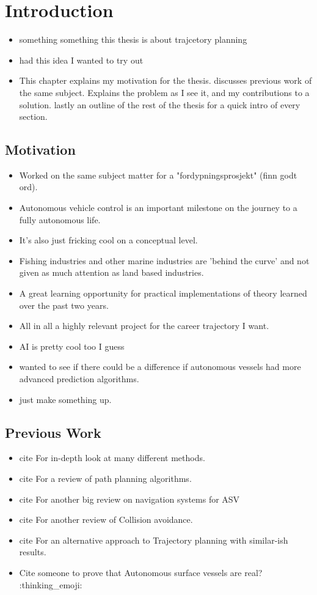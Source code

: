 \section{Introduction}
\begin{itemize}
    \item something something this thesis is about trajcetory planning
    \item had this idea I wanted to try out
    \item This chapter explains my motivation for the thesis. discusses previous work of the same subject.
    Explains the problem as I see it, and my contributions to a solution. lastly an outline of the rest of the thesis for a quick intro of every section.
\end{itemize}
\subsection{Motivation}
\begin{itemize}
    \item Worked on the same subject matter for a "fordypningsprosjekt" (finn godt ord).
    \item Autonomous vehicle control is an important milestone on the journey to a fully autonomous life.
    \item It's also just fricking cool on a conceptual level.
    \item Fishing industries and other marine industries are 'behind the curve' and not given as much attention as land based industries.
    \item A great learning opportunity for practical implementations of theory learned over the past two years.
    \item All in all a highly relevant project for the career trajectory I want.
    \item AI is pretty cool too I guess
    \item wanted to see if there could be a difference if autonomous vessels had more advanced prediction algorithms.
    \item just make something up.
\end{itemize}

\subsection{Previous Work}
\begin{itemize}
    \item cite \cite{loe2007collision} For in-depth look at many different methods.
    \item cite \cite{vagale2021path} For a review of path planning algorithms.
    \item cite \cite{zhang2021collision} For another big review on navigation systems for ASV
    \item cite \cite{huang2020ship} For another review of Collision avoidance.
    \item cite \cite{park2020social} For an alternative approach to Trajectory planning with similar-ish results.
    \item Cite someone to prove that Autonomous surface vessels are real? :thinking\_emoji:
\end{itemize}

